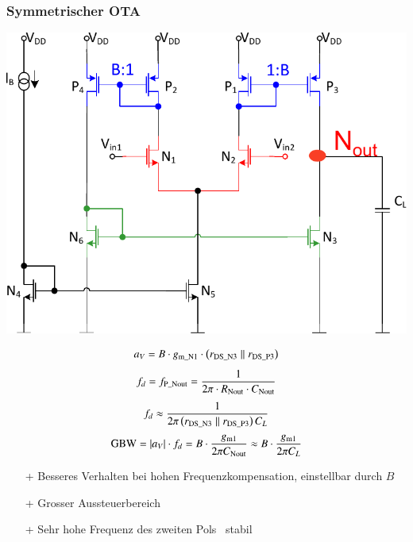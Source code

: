 \subsubsection{Symmetrischer OTA}
\begin{minipage}[t]{0.48\columnwidth}
    \includegraphics[width=\columnwidth, align=t]{images/11_OTA_einstufig_symmetrisch.pdf}
\end{minipage}
\hfill
\begin{minipage}[t]{0.48\columnwidth}
    \[
        a_V = B \cdot  g_{\rm m\_N1} \cdot \left( r_{\rm DS\_N3} \parallel r_{\rm DS\_P3} \right)
    \]
    \[
        f_d = f_{\rm P\_Nout} = \frac{1}{2 \pi \cdot R_{\rm Nout} \cdot C_{\rm Nout}}
    \]
    \[
        f_d \approx \frac{1}{2 \pi \left( r_{\rm DS\_N3} \parallel r_{\rm DS\_P3} \right) C_L}
    \]
    \[
        \text{GBW} = \abs{a_V} \cdot f_d = B \cdot \frac{g_{\rm m1}}{2 \pi C_{\rm Nout}} \approx B \cdot \frac{g_{\rm m1}}{2 \pi C_L}   %
    \]
\end{minipage}

\smallskip

\begin{itemize}
    \item[+] Besseres Verhalten bei hohen Frequenzkompensation, einstellbar durch $B$
    \item[+] Grosser Aussteuerbereich
    \item[+] Sehr hohe Frequenz des zweiten Pols \textrightarrow\ stabil
\end{itemize}


